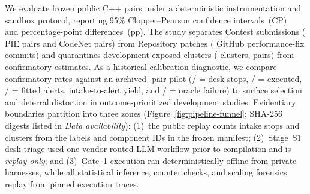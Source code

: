 \documentclass[11pt]{article}
\begin{document}
We evaluate \BenchPairs{} frozen public C++ pairs under a deterministic instrumentation and sandbox protocol, reporting 95\% Clopper--Pearson confidence intervals~(CP)~\cite{clopper1934use} and percentage-point differences~(pp).
The study separates Contest submissions (\BenchPIE{} PIE pairs and \BenchCodeNet{} CodeNet pairs) from Repository patches (\BenchGitHub{} GitHub performance-fix commits) and quarantines development-exposed clusters (\BenchQuarClustersN{} clusters, \BenchQuarPairsN{} pairs) from confirmatory estimates.
As a historical calibration diagnostic, we compare confirmatory rates against an archived \BenchPilotPairs{}-pair pilot (\BenchPilotDeskN{}/\BenchPilotPairs{} = \BenchPilotDeskPct{} desk stops, \BenchPilotExecN{}/\BenchPilotPairs{} = \BenchPilotExecPct{} executed, \BenchPilotAlertN{}/\BenchPilotFitN{} = \BenchPilotAlertPct{} fitted alerts, \BenchPilotIntakeAlertPct{} intake-to-alert yield, and \BenchPilotOracleN{}/\BenchPilotExecN{} = \BenchPilotOraclePct{} oracle failure) to surface selection and deferral distortion in outcome-prioritized development studies.
Evidentiary boundaries partition into three zones (Figure~\ref{fig:pipeline-funnel}; SHA-256 digests listed in \emph{Data availability}): (1)~the public replay counts intake stops and clusters from the labels and component IDs in the frozen manifest; (2)~Stage~S1 desk triage used one vendor-routed LLM workflow prior to compilation and is \emph{replay-only}; and (3)~Gate~1 execution ran deterministically offline from private harnesses, while all statistical inference, counter checks, and scaling forensics replay from pinned execution traces.
\end{document}
